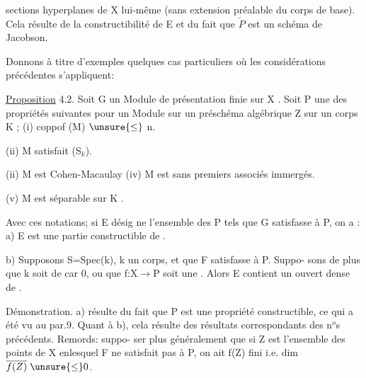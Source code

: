 
sections hyperplanes de X lui-même (sans extension préalable du corps
de base). Cela résulte  de la constructibilité de E et du fait
que $\check{P}$ est un schéma de Jacobson.

Donnons à titre d'exemples quelques cas particuliers où les
considérations précédentes s'appliquent:

\uline{Proposition} 4.2. Soit G un Module de présentation finie sur X .
Soit P une des propriétés suivantes pour un Module sur un préschéma
algébrique Z sur un corps K ;
(i) coppof (M) $\unsure{\leq}$ n.

(ii) M satisfait (S$_{k}$).

(ii) M est Cohen-Macaulay
(iv) M est sans  premiers associés immergés.

(v) M est séparable sur  K .


 Avec ces notations; si E désig%
ne l'ensemble des \hand{$\xi\in$} P tels que G\hand{$_{\xi}$} satisfasse à P, on a :
a) E est une partie constructible de  .

b) Supposons S=Spec(k), k un corps, et que F satisfasse à P. Suppo-%
sons de plus  que k soit de car 0, ou que f:X$\rightarrow$P soit une . 
Alors E contient un ouvert dense de  .

Démonstration. a) résulte du fait que P est une propriété
constructible, ce qui a été vu au par.9. Quant à b), cela résulte
des résultats correspondants des  n$^{o}$s précédents. Remords: suppo-%
ser plus généralement que si Z est l'ensemble des points de X enlesquel%
F ne satisfait pas à P, on ait f(Z) fini i.e. dim $\overline{f(Z)}\;\unsure{\leq}0$.

